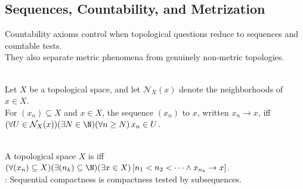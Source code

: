 \subsection{Sequences, Countability, and Metrization}

Countability axioms control when topological questions reduce to sequences and countable tests.\\
They also separate metric phenomena from genuinely non-metric topologies.

\begin{definition} \label{def:topological-sequence-convergence} \\
Let $X$ be a topological space, and let $\mathcal{N}_X(x)$ denote the neighborhoods of $x\in X$.\\
For $(x_n)\subseteq X$ and $x\in X$, the sequence $(x_n)$  to $x$, written $x_n\to x$, iff $(\forall U\in\mathcal{N}_X(x))(\exists N\in\N)(\forall n\geq N)\,x_n\in U$.
\end{definition}

\begin{definition} \label{def:topological-sequential-compactness} \\
A topological space $X$ is  iff $(\forall (x_n)\subseteq X)(\exists (n_k)\subseteq\N)(\exists x\in X)\,[n_1<n_2<\cdots\land x_{n_k}\to x]$.\\
: Sequential compactness is compactness tested by subsequences.
\end{definition}


